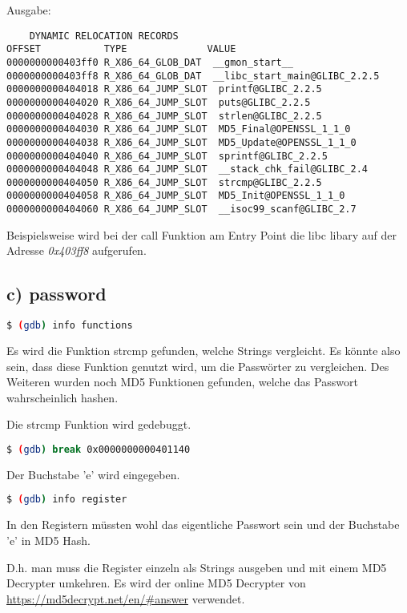 Ausgabe:

\begin{lstlisting}
    DYNAMIC RELOCATION RECORDS
OFFSET           TYPE              VALUE
0000000000403ff0 R_X86_64_GLOB_DAT  __gmon_start__
0000000000403ff8 R_X86_64_GLOB_DAT  __libc_start_main@GLIBC_2.2.5
0000000000404018 R_X86_64_JUMP_SLOT  printf@GLIBC_2.2.5
0000000000404020 R_X86_64_JUMP_SLOT  puts@GLIBC_2.2.5
0000000000404028 R_X86_64_JUMP_SLOT  strlen@GLIBC_2.2.5
0000000000404030 R_X86_64_JUMP_SLOT  MD5_Final@OPENSSL_1_1_0
0000000000404038 R_X86_64_JUMP_SLOT  MD5_Update@OPENSSL_1_1_0
0000000000404040 R_X86_64_JUMP_SLOT  sprintf@GLIBC_2.2.5
0000000000404048 R_X86_64_JUMP_SLOT  __stack_chk_fail@GLIBC_2.4
0000000000404050 R_X86_64_JUMP_SLOT  strcmp@GLIBC_2.2.5
0000000000404058 R_X86_64_JUMP_SLOT  MD5_Init@OPENSSL_1_1_0
0000000000404060 R_X86_64_JUMP_SLOT  __isoc99_scanf@GLIBC_2.7
\end{lstlisting}

Beispielsweise wird bei der call Funktion am Entry Point die libc libary auf der Adresse
\textit{0x403ff8} aufgerufen.

\subsection*{c) password}

\begin{lstlisting}[language=bash]
    $ (gdb) info functions
\end{lstlisting}

Es wird die Funktion strcmp gefunden, welche Strings vergleicht. Es könnte also sein, dass
diese Funktion genutzt wird, um die Passwörter zu vergleichen.
Des Weiteren wurden noch MD5 Funktionen gefunden, welche das Passwort wahrscheinlich hashen.

Die strcmp Funktion wird gedebuggt.

\begin{lstlisting}[language=bash]
    $ (gdb) break 0x0000000000401140
\end{lstlisting}

Der Buchstabe 'e' wird eingegeben.

\begin{lstlisting}[language=bash]
    $ (gdb) info register
\end{lstlisting}

In den Registern müssten wohl das eigentliche Passwort sein und der Buchstabe 'e' in MD5 Hash.

D.h. man muss die Register einzeln als Strings ausgeben und mit einem MD5 Decrypter umkehren.
Es wird der online MD5 Decrypter von \url{https://md5decrypt.net/en/#answer} verwendet.

